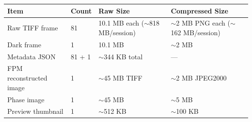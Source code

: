\begin{longtable}{L{3.8cm}L{1.5cm}L{4cm}L{4cm}}
\toprule
\textbf{Item} & \textbf{Count} & \textbf{Raw Size} & \textbf{Compressed Size} \\
\midrule
Raw TIFF frame & 81 & 10.1 MB each ($\sim$818 MB/session) & $\sim$2 MB PNG each ($\sim$162 MB/session) \\
Dark frame & 1 & 10.1 MB & $\sim$2 MB \\
Metadata JSON & 81 + 1 & $\sim$344 KB total & --- \\
FPM reconstructed image & 1 & $\sim$45 MB TIFF & $\sim$2 MB JPEG2000 \\
Phase image & 1 & $\sim$45 MB & $\sim$5 MB \\
Preview thumbnail & 1 & $\sim$512 KB & $\sim$100 KB \\
\bottomrule
\end{longtable}
